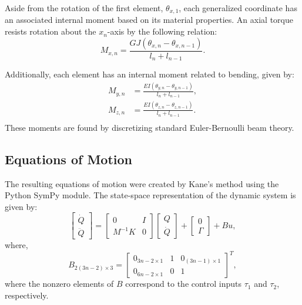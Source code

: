 \documentclass[letterpaper,10pt,conference]{ieeeconf}   %
\begin{document}
Aside from the rotation of the first element, $\theta_{x,1}$, each generalized coordinate has an associated internal moment based on its material properties. An axial torque resists rotation about the $x_n$-axis by the following relation:
%
\begin{equation}
\label{eq:m_x}
M_{x,n} = \frac{GJ (\theta_{x,n} - \theta_{x,n-1})}{l_n + l_{n-1}}.
\end{equation}
%

Additionally, each element has an internal moment related to bending, given by:
%
\begin{equation}
\begin{aligned}
\label{eq:m_y}
M_{y,n} &= \frac{EI (\theta_{y,n} - \theta_{y,n-1})}{l_n + l_{n-1}}, \\
\label{eq:m_z}
M_{z,n} &= \frac{EI (\theta_{z,n} - \theta_{z,n-1})}{l_n + l_{n-1}}. \\
\end{aligned}
\end{equation}
%
These moments are found by discretizing standard Euler-Bernoulli beam theory. 

\subsection{Equations of Motion}
\label{sec:equationsmotion}

The resulting equations of motion were created by Kane's method using the Python SymPy module. The state-space representation of the dynamic system is given by:
%
\begin{equation}
\label{eq:eqmotion}
\begin{bmatrix}
 \dot{Q}\\
 \ddot{Q}
\end{bmatrix}
=
\begin{bmatrix}
 0 & I \\
 M^{-1} K & 0
\end{bmatrix} 
\begin{bmatrix}
 Q\\
 \dot{Q}
\end{bmatrix}
+
\begin{bmatrix}
0 \\
\Gamma
\end{bmatrix}
 + B u,
\end{equation} 
%
where,
%
\begin{equation}
\label{eq:B_matrix}
B_{2(3n-2) \times 3} = 
\begin{bmatrix}
0_{3n - 2 \times 1} & 1 & 0_{(3n - 1) \times 1} \\
0_{6n - 2\times 1} & 0 & 1
\end{bmatrix}^T,
\end{equation}
%
where the nonzero elements of $B$ correspond to the control inputs $\tau_1$ and $\tau_2$, respectively. 



\end{document}
